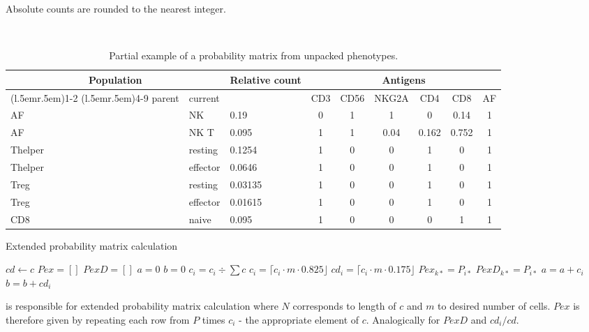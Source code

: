   Absolute counts are rounded to the nearest integer.
  
\begin{table}\small\sf\
\label{tab:unpacked_pheno}
\begin{tabular}{lllcccccc}\toprule 
\multicolumn{2}{c}{Population}  &  \multirow{2}{3.5em}{Relative count} & \multicolumn{6}{c}{Antigens}\\ 
\cmidrule(l{.5em}r{.5em}){1-2}
\cmidrule(l{.5em}r{.5em}){4-9}
parent & current & {} & CD3 & CD56 & NKG2A  & CD4   & CD8   & AF\\
\midrule
AF          & NK       & 0.19     & 0   & 1    & 1     & 0     & 0.14  & 1  \\
AF          & NK T     & 0.095    & 1   & 1    & 0.04  & 0.162 & 0.752 & 1  \\
Thelper     & resting  & 0.1254   & 1   & 0    & 0     & 1     & 0     & 1  \\
Thelper     & effector & 0.0646   & 1   & 0    & 0     & 1     & 0     & 1  \\
Treg        & resting  & 0.03135  & 1   & 0    & 0     & 1     & 0     & 1  \\
Treg        & effector & 0.01615  & 1   & 0    & 0     & 1     & 0     & 1  \\
CD8         & naive    & 0.095    & 1   & 0    & 0     & 0     & 1     & 1  \\
\bottomrule
\end{tabular}
\caption{Partial example of a probability matrix from unpacked phenotypes.}
\end{table}
  
  \begin{algorithm}
  \caption{Extended probability matrix calculation}
  \label{alg:exprob}
  \begin{algorithmic}
  \State $cd \gets c$
  \State $Pex = []$
  \State $PexD = []$
  \State $a = 0$
  \State $b = 0$
  \State $c_i = c_i\div \sum{c}$
  \State $c_i = \lceil c_i \cdot m \cdot 0.825 \rfloor$
  \State $cd_i = \lceil c_i \cdot m \cdot 0.175 \rfloor$
  \State $Pex_{k*} = P_{i*}$
  \EndFor 
  \State $PexD_{k*} = P_{i*}$
  \EndFor 
  \State $a = a+c_i$
  \State $b = b+cd_i$
  \EndFor 
  \end{algorithmic}
  \end{algorithm}
  
   is responsible for extended probability matrix calculation where $N$ corresponds to length of $c$ and $m$ to desired number of cells. $Pex$ is therefore given by repeating each row from $P$ times $c_i$ - the appropriate element of $c$. Analogically for $PexD$ and $cd_i/cd$. 
  
